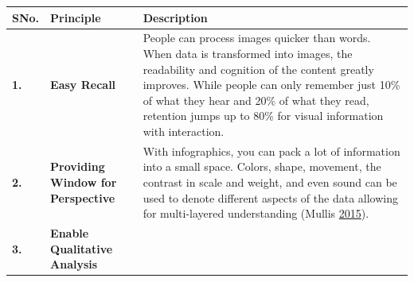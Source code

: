 \documentclass[]{book}
\begin{document}
\begin{longtable}[]{@{}lll@{}}
\toprule
\begin{minipage}[b]{0.05\columnwidth}\raggedright\strut
\textbf{SNo.}\strut
\end{minipage} & \begin{minipage}[b]{0.11\columnwidth}\raggedright\strut
\textbf{Principle}\strut
\end{minipage} & \begin{minipage}[b]{0.76\columnwidth}\raggedright\strut
\textbf{Description}\strut
\end{minipage}\tabularnewline
\midrule
\endhead
\begin{minipage}[t]{0.05\columnwidth}\raggedright\strut
\textbf{1.}\strut
\end{minipage} & \begin{minipage}[t]{0.11\columnwidth}\raggedright\strut
\textbf{Easy Recall}\strut
\end{minipage} & \begin{minipage}[t]{0.76\columnwidth}\raggedright\strut
People can process images quicker than words. When data is transformed
into images, the readability and cognition of the content greatly
improves. While people can only remember just 10\% of what they hear and
20\% of what they read, retention jumps up to 80\% for visual
information with interaction.\strut
\end{minipage}\tabularnewline
\begin{minipage}[t]{0.05\columnwidth}\raggedright\strut
\textbf{2.}\strut
\end{minipage} & \begin{minipage}[t]{0.11\columnwidth}\raggedright\strut
\textbf{Providing Window for Perspective}\strut
\end{minipage} & \begin{minipage}[t]{0.76\columnwidth}\raggedright\strut
With infographics, you can pack a lot of information into a small space.
Colors, shape, movement, the contrast in scale and weight, and even
sound can be used to denote different aspects of the data allowing for
multi-layered understanding (Mullis
\protect\hyperlink{ref-image_good}{2015}).\strut
\end{minipage}\tabularnewline
\begin{minipage}[t]{0.05\columnwidth}\raggedright\strut
\textbf{3.}\strut
\end{minipage} & \begin{minipage}[t]{0.11\columnwidth}\raggedright\strut
\textbf{Enable Qualitative Analysis}\strut

\end{minipage}
\end{longtable}
\end{document}
